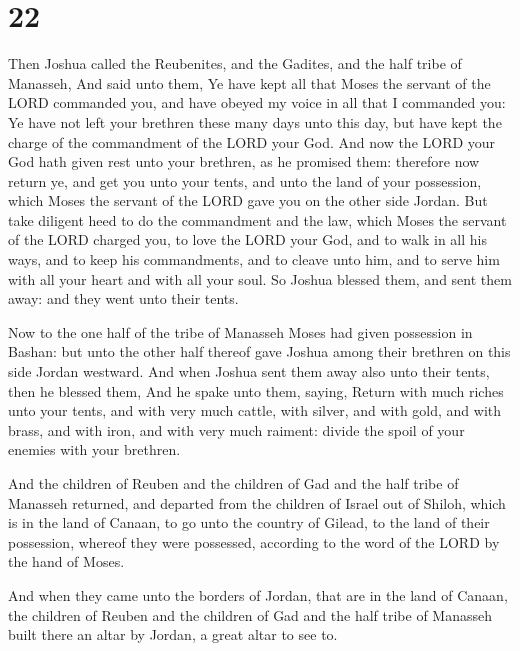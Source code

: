 \hypertarget{section-21}{%
\section{22}\label{section-21}}

 Then Joshua called the Reubenites, and the Gadites, and
the half tribe of Manasseh,  And said unto them, Ye have
kept all that Moses the servant of the LORD commanded you, and have
obeyed my voice in all that I commanded you:  Ye have not
left your brethren these many days unto this day, but have kept the
charge of the commandment of the LORD your God.  And now
the LORD your God hath given rest unto your brethren, as he promised
them: therefore now return ye, and get you unto your tents, and unto the
land of your possession, which Moses the servant of the LORD gave you on
the other side Jordan.  But take diligent heed to do the
commandment and the law, which Moses the servant of the LORD charged
you, to love the LORD your God, and to walk in all his ways, and to keep
his commandments, and to cleave unto him, and to serve him with all your
heart and with all your soul.  So Joshua blessed them, and
sent them away: and they went unto their tents.

 Now to the one half of the tribe of Manasseh Moses had
given possession in Bashan: but unto the other half thereof gave Joshua
among their brethren on this side Jordan westward. And when Joshua sent
them away also unto their tents, then he blessed them, 
And he spake unto them, saying, Return with much riches unto your tents,
and with very much cattle, with silver, and with gold, and with brass,
and with iron, and with very much raiment: divide the spoil of your
enemies with your brethren.

 And the children of Reuben and the children of Gad and
the half tribe of Manasseh returned, and departed from the children of
Israel out of Shiloh, which is in the land of Canaan, to go unto the
country of Gilead, to the land of their possession, whereof they were
possessed, according to the word of the LORD by the hand of Moses.

 And when they came unto the borders of Jordan, that are
in the land of Canaan, the children of Reuben and the children of Gad
and the half tribe of Manasseh built there an altar by Jordan, a great
altar to see to.

